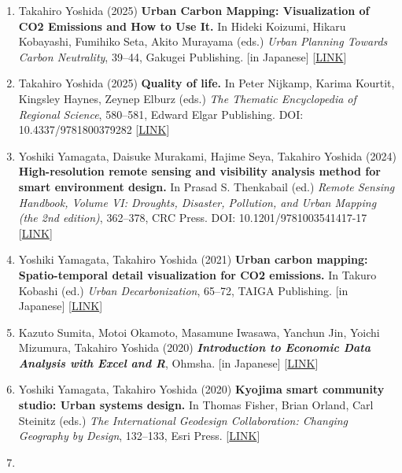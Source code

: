 \documentclass[
]{book}
\providecommand{\tightlist}{%
  \setlength{\itemsep}{0pt}\setlength{\parskip}{0pt}}
\begin{document}
\begin{enumerate}
\def\labelenumi{\arabic{enumi}.}
\tightlist
\item
  Takahiro Yoshida (2025)
  \textbf{Urban Carbon Mapping: Visualization of CO2 Emissions and How to Use It.}
  In Hideki Koizumi, Hikaru Kobayashi, Fumihiko Seta, Akito Murayama (eds.)
  \emph{Urban Planning Towards Carbon Neutrality}, 39--44, Gakugei Publishing.
  {[}in Japanese{]} {[}\href{https://book.gakugei-pub.co.jp/gakugei-book/9784761533144/}{LINK}{]}
\item
  Takahiro Yoshida (2025)
  \textbf{Quality of life.}
  In Peter Nijkamp, Karima Kourtit, Kingsley Haynes, Zeynep Elburz (eds.)
  \emph{The Thematic Encyclopedia of Regional Science}, 580--581, Edward Elgar Publishing.
  DOI: 10.4337/9781800379282 {[}\href{https://www.e-elgar.com/shop/gbp/thematic-encyclopedia-of-regional-science-9781800379275.html?srsltid=AfmBOooptnm6phReAleadX5VhoN1UoLkXsyzJf9tqskct2fYabdl7h6L}{LINK}{]}
\item
  Yoshiki Yamagata, Daisuke Murakami, Hajime Seya, Takahiro Yoshida (2024)
  \textbf{High-resolution remote sensing and visibility analysis method for smart environment design.}
  In Prasad S. Thenkabail (ed.)
  \emph{Remote Sensing Handbook, Volume VI: Droughts, Disaster, Pollution, and Urban Mapping (the 2nd edition)}, 362--378, CRC Press.
  DOI: 10.1201/9781003541417-17 {[}\href{https://doi.org/10.1201/9781003541417-17}{LINK}{]}
\item
  Yoshiki Yamagata, Takahiro Yoshida (2021)
  \textbf{Urban carbon mapping: Spatio-temporal detail visualization for CO2 emissions.}
  In Takuro Kobashi (ed.)
  \emph{Urban Decarbonization}, 65--72, TAIGA Publishing.
  {[}in Japanese{]} {[}\href{https://www.taigashuppan.co.jp/products/detail/552}{LINK}{]}
\item
  Kazuto Sumita, Motoi Okamoto, Masamune Iwasawa, Yanchun Jin, Yoichi Mizumura, Takahiro Yoshida (2020)
  \textbf{\emph{Introduction to Economic Data Analysis with Excel and R}}, Ohmsha.
  {[}in Japanese{]} {[}\href{https://www.ohmsha.co.jp/book/9784274225628/}{LINK}{]}
\item
  Yoshiki Yamagata, Takahiro Yoshida (2020)
  \textbf{Kyojima smart community studio: Urban systems design.}
  In Thomas Fisher, Brian Orland, Carl Steinitz (eds.)
  \emph{The International Geodesign Collaboration: Changing Geography by Design}, 132--133, Esri Press.
  {[}\href{https://esripress.esri.com/display/index.cfm?fuseaction=display&websiteID=388&moduleID=0}{LINK}{]}
\item

\end{enumerate}
\end{document}
